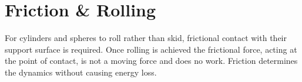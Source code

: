 \section{Friction \& Rolling}
For cylinders and spheres to roll rather than skid, frictional contact with their support surface is required.  Once rolling is achieved the frictional force, acting at the point of contact, is not a moving force and does no work.  Friction determines the dynamics without causing energy loss.\\



